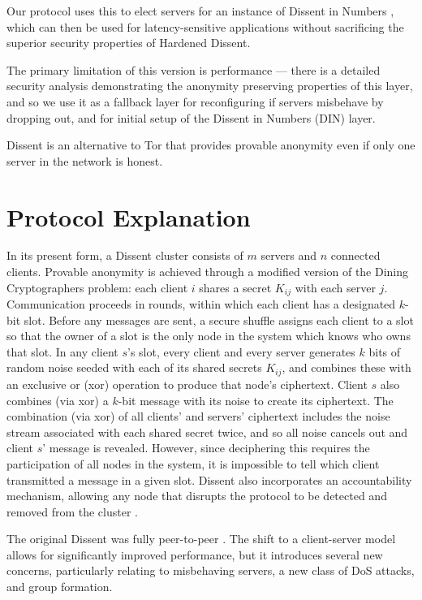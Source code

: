 Our protocol uses this to elect servers for an instance of Dissent in
Numbers \cite{din}, which can then be used for latency-sensitive applications
without sacrificing the superior security properties of Hardened Dissent.

The primary limitation of this
version is performance --- there is a detailed security analysis demonstrating
the anonymity preserving properties of this layer, and so we use it as a
fallback layer for reconfiguring if servers misbehave by dropping out, and for
initial setup of the Dissent in Numbers (DIN) layer.

  Dissent is an alternative to Tor that provides provable anonymity even if
  only one server in the network is honest\cite{p2pd}.
  \section{Protocol Explanation}
  In its present form, a Dissent cluster consists of $m$ servers and $n$
  connected clients\cite{din}. Provable anonymity is
  achieved through a modified version of the Dining Cryptographers
  problem\cite{chaum_dining_1988}: each client $i$ shares a secret $K_{ij}$
  with each server $j$. Communication proceeds in rounds, within which each
  client has a designated $k$-bit slot.  Before any messages are sent, a
  secure shuffle\cite{neff} assigns each client to a slot so
  that the owner of a slot is the only node in the system which knows who owns
  that slot.  In any client $s$'s slot, every client and every server
  generates $k$ bits of random noise seeded with each of its shared secrets
  $K_{ij}$, and combines these with an exclusive or (xor) operation to produce
  that node's ciphertext. Client $s$ also combines (via xor) a $k$-bit message
  with its noise to create its ciphertext. The combination (via xor) of all
  clients' and servers' ciphertext includes the noise stream associated with
  each shared secret twice, and so all noise cancels out and client $s$'
  message is revealed. However, since deciphering this requires the
  participation of all nodes in the system, it is impossible to tell which
  client transmitted a message in a given slot. Dissent also incorporates an
  accountability mechanism, allowing any node that disrupts the protocol to be
  detected and removed from the cluster
  \cite{verdict}.

  The original Dissent was fully peer-to-peer
  \cite{p2pd}. The shift to a client-server model
  allows for significantly improved performance, but it introduces several new
  concerns, particularly relating to misbehaving servers, a new class of DoS
  attacks, and group formation.

